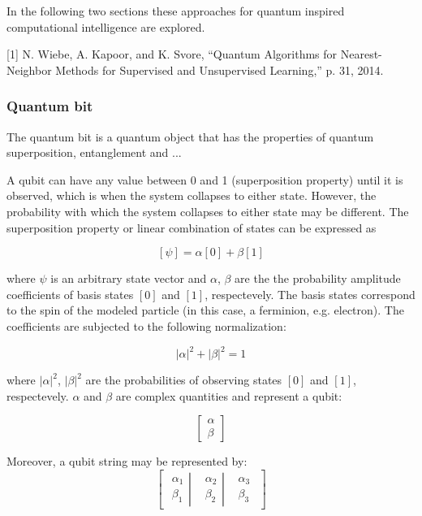 In the following two sections these approaches for quantum inspired computational intelligence are explored.

[1] N. Wiebe, A. Kapoor, and K. Svore, “Quantum Algorithms for Nearest-Neighbor Methods for Supervised and Unsupervised Learning,” p. 31, 2014.

\subsubsection{Quantum bit}

The quantum bit is a quantum object that has the properties of quantum superposition, entanglement and ...


A qubit can have any value between 0 and 1 (superposition property) until it is observed, which is when the system collapses to either state. However, the probability with which the system collapses to either state  may be different. The superposition property or linear combination of states can be expressed as

$$
[\psi] = \alpha[0] + \beta[1]
$$

where $\psi$ is an arbitrary state vector and $\alpha$, $\beta$ are the the probability amplitude coefficients of basis states $[0]$ and $[1]$, respectevely. The basis states correspond to the spin of the modeled particle (in this case, a ferminion, e.g. electron). The coefficients are subjected to the following normalization:

$$|\alpha|^2 + |\beta|^2 = 1$$

where $|\alpha|^2$, $|\beta|^2$ are the probabilities of observing states $[0]$ and $[1]$, respectevely. $\alpha$ and $\beta$ are complex quantities and represent a qubit:

$$\begin{bmatrix}
\alpha \\
\beta
\end{bmatrix}$$

Moreover, a qubit string may be represented by:
$$
\begin{bmatrix}
\left.\begin{matrix}
\alpha_1\\ 
\beta_1
\end{matrix}\right| & \left.\begin{matrix}
\alpha_2\\ 
\beta_2
\end{matrix}\right| & \begin{matrix}
\alpha_3\\ 
\beta_3
\end{matrix}
\end{bmatrix}
$$

